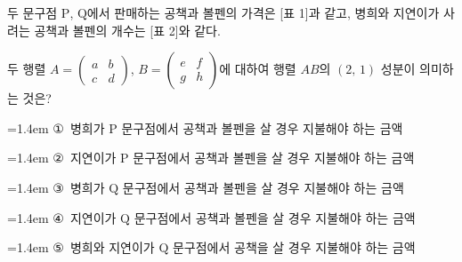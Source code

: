 두 문구점 $\mathrm{P}$, $\mathrm{Q}$에서 판매하는 공책과 볼펜의 가격은 [표 1]과 같고, 병희와 지연이가 사려는 공책과 볼펜의 개수는 [표 2]와 같다.\par\smallskip\dispeq{}\par\smallskip\noindent 두 행렬 $A=\begin{pmatrix} a & b \\ c & d \end{pmatrix}$, $B=\begin{pmatrix} e & f \\ g & h \end{pmatrix}$에 대하여 행렬 $AB$의 $(2,\,1)$ 성분이 의미하는 것은?
\par\medskip\par\noindent\hangindent=1.4em {\small ①}\ 병희가 $\mathrm{P}$ 문구점에서 공책과 볼펜을 살 경우 지불해야 하는 금액\par\noindent\hangindent=1.4em {\small ②}\ 지연이가 $\mathrm{P}$ 문구점에서 공책과 볼펜을 살 경우 지불해야 하는 금액\par\noindent\hangindent=1.4em {\small ③}\ 병희가 $\mathrm{Q}$ 문구점에서 공책과 볼펜을 살 경우 지불해야 하는 금액\par\noindent\hangindent=1.4em {\small ④}\ 지연이가 $\mathrm{Q}$ 문구점에서 공책과 볼펜을 살 경우 지불해야 하는 금액\par\noindent\hangindent=1.4em {\small ⑤}\ 병희와 지연이가 $\mathrm{Q}$ 문구점에서 공책을 살 경우 지불해야 하는 금액\par\medskip
